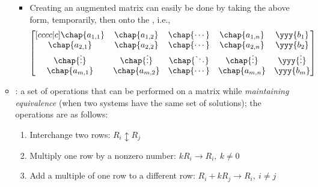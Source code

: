 \begin{itemize}
\begin{itemize}
\begin{itemize}
        \item Creating an augmented matrix can easily be done by taking the above form,  temporarily, then  onto the , i.e.,
      \[%
      \begin{bmatrix}[cccc|c]
        \chap{a_{1,1}} & \chap{a_{1,2}} & \chap{\cdots} & \chap{a_{1,n}} & \yyy{b_1}\\
        \chap{a_{2,1}} & \chap{a_{2,2}} & \chap{\cdots} & \chap{a_{2,n}} & \yyy{b_2}\\
        \chap{\vdots} & \chap{\vdots} & \chap{\ddots} & \chap{\vdots} & \yyy{\vdots} \\
        \chap{a_{m,1}} & \chap{a_{m,2}} & \chap{\cdots} & \chap{a_{m,n}} & \yyy{b_m}
        \end{bmatrix}
      \]%
      \end{itemize} 
    \item {}: a set of operations that can be performed on a matrix while \emph{maintaining equivalence} (when two systems have the same set of solutions); the operations are as follows:
      \begin{enumerate}
        \item Interchange two rows: \emph{\(R_i \updownarrow R_j\)}
        \item Multiply one row by a nonzero number: \emph{\(kR_i \rightarrow R_i,~k\neq 0\)}
        \item Add a multiple of one row to a different row: \emph{\(R_i + kR_j \rightarrow R_i,~i\neq j\)}
      \end{enumerate}
  \end{itemize}
\end{itemize}

